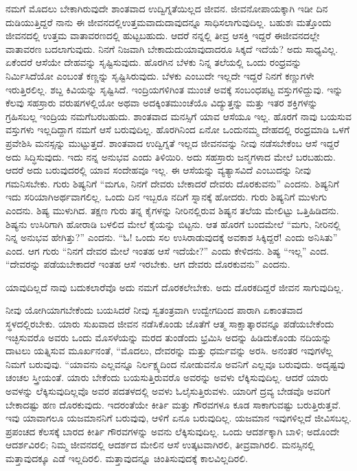 ನಮಗೆ ಮೊದಲು ಬೇಕಾಗಿರುವುದೇ ಶಾಂತವಾದ ಉದ್ವಿಗ್ನತೆಯಿಲ್ಲದ ಜೀವನ. ಜೀವನೋಪಾಯಕ್ಕಾಗಿ ಇಡೀ ದಿನ ದುಡಿಯುತ್ತಿದ್ದರೆ ನಾನು ಈ ಜೀವನದಲ್ಲಿ\break ಉತ್ತಮವಾದುದಾವುದನ್ನೂ ಸಾಧಿಸಲಾಗುವುದಿಲ್ಲ. ಬಹುಶಃ ಮತ್ತೊಂದು ಜೀವನದಲ್ಲಿ ಉತ್ತಮ ವಾತಾವರಣದಲ್ಲಿ ಹುಟ್ಟಬಹುದು. ಆದರೆ ನನ್ನಲ್ಲಿ ತೀವ್ರ ಆಸಕ್ತಿ ಇದ್ದರೆ ಈ\break ಜೀವನದಲ್ಲೇ ವಾತಾವರಣ ಬದಲಾಗುವುದು. ನಿನಗೆ ನಿಜವಾಗಿ ಬೇಕಾದುದು\break ಯಾವುದಾದರೂ ಸಿಕ್ಕದೆ ಇದೆಯೆ? ಅದು ಸಾಧ್ಯವಿಲ್ಲ. ಏಕೆಂದರೆ ಆಸೆಯೇ ದೇಹವನ್ನು ಸೃಷ್ಟಿಸುವುದು. ಹೊರಗಿನ ಬೆಳಕು ನಿನ್ನ ತಲೆಯಲ್ಲಿ ಒಂದು ರಂಧ್ರವನ್ನು ನಿರ್ಮಿಸಿದೆಯೋ ಎಂಬಂತೆ ಕಣ್ಣನ್ನು ಸೃಷ್ಟಿಸಿರುವುದು. ಬೆಳಕು ಎಂಬುದೇ ಇಲ್ಲದೇ ಇದ್ದರೆ ನಿನಗೆ ಕಣ್ಣುಗಳೇ ಇರುತ್ತಿರಲಿಲ್ಲ. ಶಬ್ದ ಕಿವಿಯನ್ನು ಸೃಷ್ಟಿಸಿದೆ. ಇಂದ್ರಿಯಗಳಿಗಿಂತ ಮುಂಚೆ ಅವಕ್ಕೆ ಸಂಬಂಧಪಟ್ಟ ವಸ್ತುಗಳಿದ್ದುವು. ಇನ್ನು ಕೆಲವು ಸಹಸ್ರಾರು ವರುಷಗಳಲ್ಲಿಯೋ ಅಥವಾ ಅದಕ್ಕಿಂತ\break ಮುಂಚೆಯೊ ವಿದ್ಯುತ್ತನ್ನು ಮತ್ತು ಇತರ ಶಕ್ತಿಗಳನ್ನು ಗ್ರಹಿಸಬಲ್ಲ ಇಂದ್ರಿಯ ನಮಗೆ\break ಬರಬಹುದು. ಶಾಂತವಾದ ಮನಸ್ಸಿಗೆ ಯಾವ ಆಸೆಯೂ ಇಲ್ಲ. ಹೊರಗೆ ನಾವು ಬಯಸುವ ವಸ್ತುಗಳು ಇಲ್ಲದಿದ್ದಾಗ ನಮಗೆ ಆಸೆ ಬರುವುದಿಲ್ಲ. ಹೊರಗಿನಿಂದ ಏನೋ ಒಂದು\break ನಮ್ಮ ದೇಹದಲ್ಲಿ ರಂಧ್ರಮಾಡಿ ಒಳಗೆ ಪ್ರವೇಶಿಸಿ ಮನಸ್ಸನ್ನು ಮುಟ್ಟುತ್ತದೆ. ಶಾಂತವಾದ ಉದ್ವಿಗ್ನತೆ ಇಲ್ಲದ ಜೀವನವನ್ನು ನೀವು ನಡೆಸಬೇಕೆಂಬ ಆಸೆ ಇದ್ದರೆ ಅದು ಸಿದ್ಧಿಸುವುದು. ಇದು ನನ್ನ ಅನುಭವ ಎಂದು ತಿಳಿಯಿರಿ. ಅದು ಸಹಸ್ರಾರು ಜನ್ಮಗಳಾದ ಮೇಲೆ ಬರಬಹುದು. ಆದರೆ ಅದು ಬರುವುದರಲ್ಲಿ ಯಾವ ಸಂದೇಹವೂ ಇಲ್ಲ. ಈ ಆಸೆಯನ್ನು ವ್ಯತ್ಯಾಸವಿದೆ ಎಂಬುದನ್ನು ನೀವು ಗಮನಿಸಬೇಕು. ಗುರು ಶಿಷ್ಯನಿಗೆ “ಮಗೂ, ನಿನಗೆ ದೇವರು ಬೇಕಾದರೆ ದೇವರು ದೊರಕುವನು” ಎಂದನು. ಶಿಷ್ಯನಿಗೆ ಇದು ಸರಿಯಾಗಿ\break ಅರ್ಥವಾಗಲಿಲ್ಲ. ಒಂದು ದಿನ ಇಬ್ಬರೂ ನದಿಗೆ ಸ್ನಾನಕ್ಕೆ ಹೋದರು. ಗುರು ಶಿಷ್ಯನಿಗೆ ಮುಳುಗು ಎಂದನು. ಶಿಷ್ಯ ಮುಳುಗಿದ. ತಕ್ಷಣ ಗುರು ತನ್ನ ಕೈಗಳನ್ನು ನೀರಿನಲ್ಲಿರುವ ಶಿಷ್ಯನ ತಲೆಯ ಮೇಲಿಟ್ಟು ಒತ್ತಿಹಿಡಿದನು. ಶಿಷ್ಯನು ಉಸಿರಿಗಾಗಿ ಹೋರಾಡಿ ಬಳಲಿದ ಮೇಲೆ ಕೈಯನ್ನು ಬಿಟ್ಟನು. ಆತ ಹೊರಗೆ ಬಂದಮೇಲೆ “ಮಗು, ನೀರಿನಲ್ಲಿ ನಿನ್ನ ಅನುಭವ ಹೇಗಿತ್ತು?” ಎಂದನು. “ಓ! ಒಂದು ಸಲ ಉಸಿರಾಡುವುದಕ್ಕೆ ಅವಕಾಶ ಸಿಕ್ಕಿದ್ದರೆ! ಎಂದು ಅನಿಸಿತು” ಎಂದ. ಆಗ ಗುರು “ನಿನಗೆ ದೇವರ ಮೇಲೆ ಇಂತಹ ಆಸೆ ಇದೆಯೇ?” ಎಂದು ಕೇಳಿದನು. ಶಿಷ್ಯ “ಇಲ್ಲ” ಎಂದ. “ದೇವರನ್ನು ಪಡೆಯಬೇಕಾದರೆ ಇಂತಹ ಆಸೆ ಇರಬೇಕು. ಆಗ ದೇವರು ದೊರಕುವನು” ಎಂದನು.

ಯಾವುದಿಲ್ಲದೆ ನಾವು ಬದುಕಲಾರೆವೊ ಅದು ನಮಗೆ ದೊರಕಲೇಬೇಕು. ಅದು ದೊರಕದಿದ್ದರೆ ಜೀವನ ಸಾಗುವುದಿಲ್ಲ.

ನೀವು ಯೋಗಿಯಾಗಬೇಕೆಂದು ಬಯಸಿದರೆ ನೀವು ಸ್ವತಂತ್ರವಾಗಿ ಉದ್ವೇಗದಿಂದ ಪಾರಾಗಿ ಏಕಾಂತವಾದ ಸ್ಥಳದಲ್ಲಿರಬೇಕು. ಯಾರು ಸುಖವಾದ ಜೀವನ ನಡೆಸಿಕೊಂಡು ಜೊತೆಗೆ ಆತ್ಮ ಸಾಕ್ಷಾತ್ಕಾರವನ್ನೂ ಪಡೆಯಬೇಕೆಂದು ಇಚ್ಛಿಸುವರೊ ಅವರು ಒಂದು ಮೊಸಳೆಯನ್ನು ಮರದ ತುಂಡೆಂದು ಭ್ರಮಿಸಿ ಅದನ್ನು ಹಿಡಿದುಕೊಂಡು ನದಿಯನ್ನು ದಾಟಲು ಯತ್ನಿಸುವ ಮೂರ್ಖನಂತೆ, “ಮೊದಲು, ದೇವರನ್ನು ಮತ್ತು ಧರ್ಮವನ್ನು ಅರಸಿ. ಅನಂತರ ಇವುಗಳೆಲ್ಲ ನಿಮಗೆ ಬರುವುವು. “ಯಾವನು ಎಲ್ಲವನ್ನೂ ನಿರ್ಲಕ್ಷ್ಯದಿಂದ ನೋಡುವನೊ ಅವನಿಗೆ ಎಲ್ಲವೂ ಬರುವುದು. ಅದೃಷ್ಟವು ಚಂಚಲ ಸ್ತ್ರೀಯಂತೆ. ಯಾರು ಬೇಕೆಂದು ಬಯಸುತ್ತಿರುವರೊ ಅವರನ್ನು ಅವಳು ಲೆಕ್ಕಿಸುವುದಿಲ್ಲ. ಆದರೆ ಯಾರು ಅವಳನ್ನು ಲೆಕ್ಕಿಸುವುದಿಲ್ಲವೊ ಅವರ ಪದತಳದಲ್ಲಿ ಅವಳು ಓಲೈಸುತ್ತಿರುವಳು. ಯಾರಿಗೆ ದ್ರವ್ಯ ಬೇಡವೊ ಅವರಿಗೆ ಬೇಕಾದಷ್ಟು ಹಣ ದೊರಕುವುದು. ಇದರಂತೆಯೇ ಕೀರ್ತಿ ಮತ್ತು ಗೌರವಗಳೂ ಕೂಡ ಸಾಕಾಗುವಷ್ಟು ಬರುತ್ತಿರುತ್ತವೆ. ಇವು ಯಾವಾಗಲೂ ಯಜಮಾನನಿಗೆ ಬರುವುವು, ಆಳಿಗೆ ಏನೂ ಬರುವುದಿಲ್ಲ. ಯಜಮಾನ ಇವುಗಳಿಲ್ಲದೆ ಜೀವಿಸಬಲ್ಲ. ಪ್ರಪಂಚದ ಕೆಲಸಕ್ಕೆ ಬಾರದ ಕೀರ್ತಿ ಗೌರವಗಳನ್ನು ಅವನು ಲೆಕ್ಕಿಸುವುದಿಲ್ಲ. ಒಂದು ಆದರ್ಶಕ್ಕಾಗಿ ಬಾಳಿ; ಅದೊಂದೇ ಆದರ್ಶವಿರಲಿ; ನಿಮ್ಮ ಜೀವನದಲ್ಲಿ ಆದರ್ಶದ ಮೇಲಿನ ಆಸೆ ಉತ್ಕಟವಾಗಿರಲಿ, ತೀವ್ರವಾಗಿರಲಿ. ಮನಸ್ಸಿನಲ್ಲಿ ಮತ್ತಾವುದಕ್ಕೂ ಎಡೆ ಇಲ್ಲದಿರಲಿ. ಮತ್ತಾವುದನ್ನೂ ಚಿಂತಿಸುವುದಕ್ಕೆ ಕಾಲವಿಲ್ಲದಿರಲಿ.


